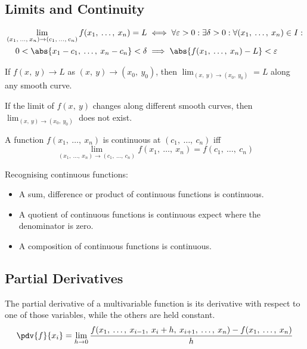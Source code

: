 \documentclass{article}
\begin{document}
\subsection{Limits and Continuity}
\begin{definition}
    \begin{align*}
		\lim_{(x_1,\: \ldots,\: x_n)\to (c_1,\: \ldots,\: c_n)} f(x_1,\: \ldots,\: x_n) = L
        &\iff\forall\varepsilon>0: \exists\delta>0: \forall (x_1,\: \ldots,\: x_n) \in I: \\
        0<\abs{x_1-c_1,\: \ldots,\: x_n-c_n}<\delta &\implies \abs{f(x_1,\: \ldots,\: x_n)-L}<\varepsilon
	\end{align*}
\end{definition}
\begin{theorem}
    If $f(x,\: y) \to L$ as $(x,\: y) \to (x_0,\: y_0)$, then
    $\displaystyle \lim_{(x,\: y) \to (x_0,\: y_0)} = L$ along any smooth
    curve.
\end{theorem}
\begin{theorem}
    If the limit of $f(x,\: y)$ changes along different smooth curves, then
    $\displaystyle \lim_{(x,\: y) \to (x_0,\: y_0)}$ does not exist.
\end{theorem}
\begin{theorem}
    A function $f(x_1,\: \ldots,\: x_n)$ is continuous at
    $(c_1,\: \ldots,\: c_n)$ iff
    \begin{equation*}
        \lim_{(x_1,\: \ldots,\: x_n)\to (c_1,\: \ldots,\: c_n)} f(x_1,\: \ldots,\: x_n) = f(c_1,\: \ldots,\: c_n)
    \end{equation*}
\end{theorem}
Recognising continuous functions:
\begin{itemize}
    \item A sum, difference or product of continuous functions is continuous.
    \item A quotient of continuous functions is continuous expect where the
        denominator is zero.
    \item A composition of continuous functions is continuous.
\end{itemize}
\subsection{Partial Derivatives}
\begin{definition}
    The partial derivative of a multivariable function is its derivative with
    respect to one of those variables, while the others are held constant.
    \begin{equation*}
        \pdv{f}{x_i} = \lim_{h \to 0} \frac{f(x_1,\: \ldots,\: x_{i-1},\: x_i+h,\: x_{i+1},\: \ldots,\: x_n) - f(x_1,\: \ldots,\: x_n)}{h}
    \end{equation*}
\end{definition}
\end{document}
